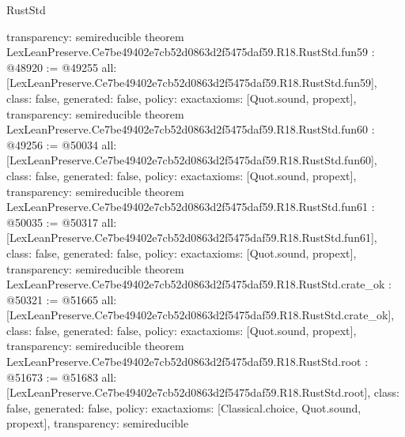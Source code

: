 \begin{lexlean}{RustStd}
\begin{coremodule}
{  transparency: semireducible
}
theorem LexLeanPreserve.Ce7be49402e7cb52d0863d2f5475daf59.R18.RustStd.fun59 : @48920 := @49255 {
  all: [LexLeanPreserve.Ce7be49402e7cb52d0863d2f5475daf59.R18.RustStd.fun59],
  class: false,
  generated: false,
  policy: exact{axioms: [Quot.sound, propext]},
  transparency: semireducible
}
theorem LexLeanPreserve.Ce7be49402e7cb52d0863d2f5475daf59.R18.RustStd.fun60 : @49256 := @50034 {
  all: [LexLeanPreserve.Ce7be49402e7cb52d0863d2f5475daf59.R18.RustStd.fun60],
  class: false,
  generated: false,
  policy: exact{axioms: [Quot.sound, propext]},
  transparency: semireducible
}
theorem LexLeanPreserve.Ce7be49402e7cb52d0863d2f5475daf59.R18.RustStd.fun61 : @50035 := @50317 {
  all: [LexLeanPreserve.Ce7be49402e7cb52d0863d2f5475daf59.R18.RustStd.fun61],
  class: false,
  generated: false,
  policy: exact{axioms: [Quot.sound, propext]},
  transparency: semireducible
}
theorem LexLeanPreserve.Ce7be49402e7cb52d0863d2f5475daf59.R18.RustStd.crate_ok : @50321 := @51665 {
  all: [LexLeanPreserve.Ce7be49402e7cb52d0863d2f5475daf59.R18.RustStd.crate_ok],
  class: false,
  generated: false,
  policy: exact{axioms: [Quot.sound, propext]},
  transparency: semireducible
}
theorem LexLeanPreserve.Ce7be49402e7cb52d0863d2f5475daf59.R18.RustStd.root : @51673 := @51683 {
  all: [LexLeanPreserve.Ce7be49402e7cb52d0863d2f5475daf59.R18.RustStd.root],
  class: false,
  generated: false,
  policy: exact{axioms: [Classical.choice, Quot.sound, propext]},
  transparency: semireducible
}


\end{coremodule}
\end{lexlean}
